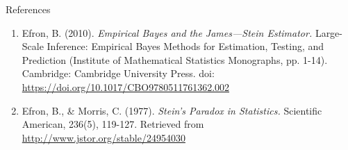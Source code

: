 \documentclass{beamer}
\begin{document}
\begin{frame}{References}
	\begin{enumerate}
		\item
			Efron, B. (2010).
			\textit{Empirical Bayes and the James—Stein Estimator.}
			Large-Scale Inference:
			Empirical Bayes Methods for Estimation, Testing, and Prediction
			(Institute of Mathematical Statistics Monographs, pp. 1-14).
			Cambridge: Cambridge University Press.
			doi: \url{https://doi.org/10.1017/CBO9780511761362.002}
		\item
			Efron, B., \& Morris, C. (1977).
			\textit{Stein's Paradox in Statistics.}
			Scientific American, 236(5), 119-127.
			Retrieved from \url{http://www.jstor.org/stable/24954030}
	\end{enumerate}
\end{frame}
\end{document}
